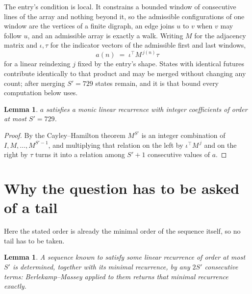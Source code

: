 \documentclass[11pt,a4paper]{article}
\theoremstyle{plain}
\newtheorem{lemma}[theorem]{Lemma}
\theoremstyle{definition}
\begin{document}
The entry's condition is local. It constrains a bounded window of consecutive lines of the
array and nothing beyond it, so the admissible configurations of one window are the vertices of
a finite digraph, an edge joins $u$ to $v$ when $v$ may follow $u$, and an admissible array is
exactly a walk. Writing $M$ for the adjacency matrix and $\iota,\tau$ for the indicator vectors
of the admissible first and last windows,
\[
a(n)\;=\;\iota^{\!\top}M^{\,j(n)}\tau
\]
for a linear reindexing $j$ fixed by the entry's shape. States with identical futures
contribute identically to that product and may be merged without changing any count; after
merging $S'=729$ states remain, and it is that bound every computation below uses.

\begin{lemma}\label{lem:cf}
$a$ satisfies a monic linear recurrence with integer coefficients of order at most $S'=729$.
\end{lemma}

\begin{proof}
By the Cayley--Hamilton theorem $M^{S'}$ is an integer combination of $I,M,\dots,M^{S'-1}$,
and multiplying that relation on the left by $\iota^{\!\top}M^{\,j}$ and on the right by
$\tau$ turns it into a relation among $S'+1$ consecutive values of $a$.
\end{proof}

\section{Why the question has to be asked of a tail}

Here the stated order is already the minimal order of the sequence itself, so no tail has to be taken.

\begin{lemma}\label{lem:bm}
A sequence known to satisfy some linear recurrence of order at most $S'$ is determined,
together with its minimal recurrence, by any $2S'$ consecutive terms: Berlekamp--Massey applied
to them returns that minimal recurrence exactly.
\end{lemma}
\end{document}

